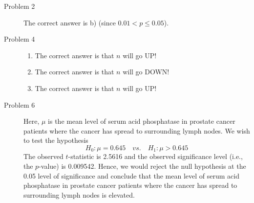 \documentclass{article}\usepackage[]{graphicx}\usepackage[]{color}
\begin{document}
\begin{description}
  \item[Problem 2] The correct answer is b) (since $0.01 < p \le 0.05$).
  
  \item[Problem 4]
  
  \begin{enumerate}
  
    \item The correct answer is that $n$ will go UP!
    
    \item The correct answer is that $n$ will go DOWN!
    
    \item The correct answer is that $n$ will go UP!
  
  \end{enumerate}

  \item[Problem 6] Here, $\mu$ is the mean level of serum acid phosphatase in prostate cancer patients where the cancer has spread to surrounding lymph nodes. We wish to test the hypothesis
  \begin{equation*}
    H_0: \mu = 0.645 \quad vs. \quad H_1: \mu > 0.645
  \end{equation*}
The observed $t$-statistic is 2.5616 and the observed significance level (i.e., the $p$-value) is 0.009542. Hence, we would reject the null hypothesis at the 0.05 level of significance and conclude that the mean level of serum acid phosphatase in prostate cancer patients where the cancer has spread to surrounding lymph nodes is elevated.

\end{description}
\end{document}
